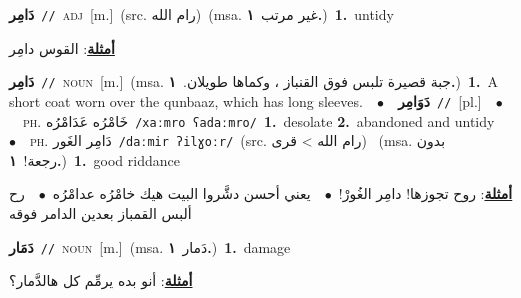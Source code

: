 \documentclass[10pt,a4paper,twoside]{article} %
\begin{document}
\begin{multicols}{2}
{\setlength\topsep{0pt}\textbf{\foreignlanguage{arabic}{دَامِر}}\ {\color{gray}\texttt{//}\color{black}}\ \textsc{adj}\ [m.]\ (src. \color{gray}\foreignlanguage{arabic}{رام الله}\color{black})\ \color{gray}(msa. \foreignlanguage{arabic}{غير مرتب}~\foreignlanguage{arabic}{\textbf{١.}})\color{black}\ \textbf{1.}~untidy\  \begin{flushright}\color{gray}\foreignlanguage{arabic}{\textbf{\underline{\foreignlanguage{arabic}{أمثلة}}}: القوس دامِر}\end{flushright}\color{black}} \vspace{2mm}

{\setlength\topsep{0pt}\textbf{\foreignlanguage{arabic}{دَامِر}}\ {\color{gray}\texttt{//}\color{black}}\ \textsc{noun}\ [m.]\ \color{gray}(msa. \foreignlanguage{arabic}{جبة قصيرة تلبس فوق القنباز ، وكماها طويلان.}~\foreignlanguage{arabic}{\textbf{١.}})\color{black}\ \textbf{1.}~A short coat worn over the qunbaaz, which has long sleeves.\ \ $\bullet$\ \ \setlength\topsep{0pt}\textbf{\foreignlanguage{arabic}{دَوَامِر}}\ {\color{gray}\texttt{//}\color{black}}\ [pl.]\ \ $\bullet$\ \ \textsc{ph.} \color{gray} \foreignlanguage{arabic}{خَامْرُه عَدَامْرُه}\color{black}\ {\color{gray}\texttt{/{\sffamily xaːmro ʕadaːmro}/}\color{black}}\ \textbf{1.}~desolate  \textbf{2.}~abandoned and untidy\ \ $\bullet$\ \ \textsc{ph.} \color{gray} \foreignlanguage{arabic}{دَامِر الغَور}\color{black}\ {\color{gray}\texttt{/{\sffamily daːmir ʔilɣoːr}/}\color{black}}\ \color{gray}(src. \foreignlanguage{arabic}{رام الله > قرى})\color{black}\ \color{gray} (msa. \foreignlanguage{arabic}{بدون رجعة!}~\foreignlanguage{arabic}{\textbf{١.}})\color{black}\ \textbf{1.}~good riddance\  \begin{flushright}\color{gray}\foreignlanguage{arabic}{\textbf{\underline{\foreignlanguage{arabic}{أمثلة}}}: روح تجوزها! دامِر الغُورْ!\ $\bullet$\ \  يعني أحسن دشَّروا البيت هيك خامْرُه عدامْرُه\ $\bullet$\ \  رح ألبس القمباز بعدين الدامر فوقه}\end{flushright}\color{black}} \vspace{2mm}

{\setlength\topsep{0pt}\textbf{\foreignlanguage{arabic}{دَمَار}}\ {\color{gray}\texttt{//}\color{black}}\ \textsc{noun}\ [m.]\ \color{gray}(msa. \foreignlanguage{arabic}{دَمار}~\foreignlanguage{arabic}{\textbf{١.}})\color{black}\ \textbf{1.}~damage\  \begin{flushright}\color{gray}\foreignlanguage{arabic}{\textbf{\underline{\foreignlanguage{arabic}{أمثلة}}}: أنو بده يرمِّم كل هالدَّمار؟}\end{flushright}\color{black}} \vspace{2mm}


\end{multicols}
\end{document}
